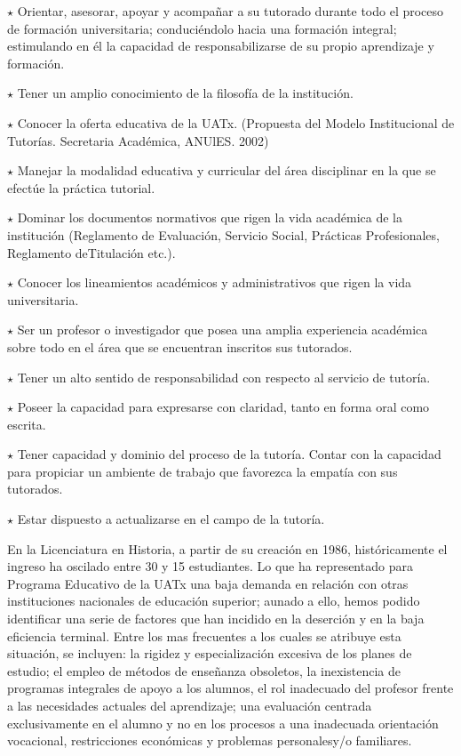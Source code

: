 \begin{Obs}
\item[$\star$] Orientar, asesorar, apoyar y acompañar a su tutorado durante todo el proceso de formación universitaria; conduciéndolo hacia una formación integral; estimulando en él la capacidad de responsabilizarse de su propio aprendizaje y formación.
\item[$\star$] Tener un amplio conocimiento de la filosofía de la institución.
\item[$\star$] Conocer la oferta educativa de la UATx.  (Propuesta del Modelo Institucional de Tutorías.  Secretaria Académica, ANUlES. 2002)
\item[$\star$] Manejar  la modalidad  educativa  y curricular  del  área  disciplinar  en  la que  se efectúe  la práctica  tutorial.
\item[$\star$] Dominar los documentos normativos que rigen la vida académica de la institución (Reglamento de Evaluación, Servicio Social, Prácticas Profesionales, Reglamento deTitulación etc.).
\item[$\star$] Conocer los lineamientos académicos y administrativos que rigen la   vida universitaria.
\item[$\star$] Ser un profesor o investigador que posea una amplia experiencia   académica sobre todo en el área que se encuentran inscritos sus tutorados.
\item[$\star$] Tener un alto sentido de responsabilidad con respecto al servicio de tutoría.
\item[$\star$] Poseer la capacidad para expresarse con claridad, tanto en forma oral  como escrita.
\item[$\star$] Tener capacidad y dominio del proceso de la tutoría.
Contar con la capacidad para  propiciar  un ambiente  de trabajo  que favorezca la empatía  con sus tutorados.
\item[$\star$] Estar dispuesto  a actualizarse  en el campo de la tutoría.
\end{Obs}

En la Licenciatura en Historia, a partir de su creación en 1986, históricamente el ingreso ha oscilado entre 30 y 15 estudiantes. Lo que ha representado para Programa Educativo de la UATx  una baja demanda en relación con otras instituciones nacionales de educación superior; aunado a ello, hemos podido identificar una serie de factores que han incidido en la deserción y en la baja eficiencia terminal.  Entre los mas frecuentes a los cuales  se atribuye  esta  situación,   se incluyen:  la rigidez  y especialización   excesiva   de  los  planes   de  estudio;   el  empleo   de  métodos   de enseñanza   obsoletos,   la  inexistencia   de  programas   integrales   de  apoyo  a  los alumnos,  el  rol  inadecuado   del  profesor  frente   a  las  necesidades actuales del aprendizaje; una  evaluación centrada  exclusivamente en el alumno y no en los procesos a una inadecuada orientación vocacional, restricciones económicas y problemas personales\linebreak y\slash{}o familiares.

